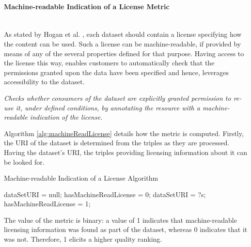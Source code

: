 \paragraph{Machine-readable Indication of a License Metric} ~\\ %
As stated by Hogan et al. \cite{Hogan2012:LDC}, each dataset should contain a license specifying how the content can be used. Such a license can be machine-readable, if provided by means of any of the several properties defined for that purpose. Having access to the license this way, enables customers to automatically check that the permissions granted upon the data have been specified and hence, leverages accessibility to the dataset.

\begin{mdframed}[style=metricdefinition]
\emph{Checks whether consumers of the dataset are explicitly granted permission to re-use it, under defined conditions, by annotating the resource with a machine-readable indication of the license.}
\end{mdframed}

Algorithm \ref{alg:machineReadLicense} details how the metric is computed. Firstly, the URI of the dataset is determined from the triples as they are processed. Having the dataset's URI, the triples providing licensing information about it can be looked for.
\begin{algorithm}
\caption{Machine-readable Indication of a License Algorithm} \label{alg:machineReadLicense}
\begin{algorithmic}[1]
\State dataSetURI = null;
\State hasMachineReadLicense = 0;
\EndProcedure
{}
\State dataSetURI = ?s;
\EndIf
{} 
\State hasMachineReadLicense = 1;
\EndIf ~\\
\EndProcedure
\end{algorithmic}
\end{algorithm}
The value of the metric is binary: a value of 1 indicates that machine-readable licensing information was found as part of the dataset, whereas 0 indicates that it was not. Therefore, 1 elicits a higher quality ranking.




